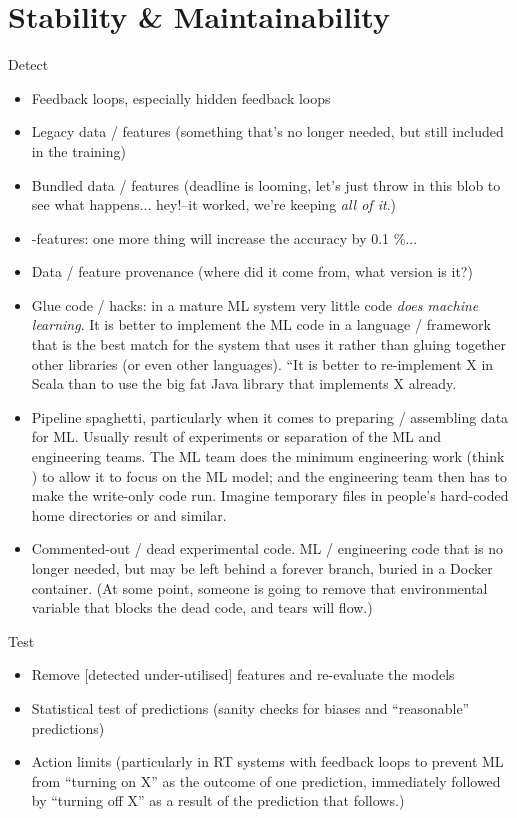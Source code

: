 \section{Stability \& Maintainability}
Detect
\begin{itemize}
  \item Feedback loops, especially hidden feedback loops
  \item Legacy data / features (something that's no longer needed, but still included in the training)
  \item Bundled data / features (deadline is looming, let's just throw in this blob to see what happens... hey!--it worked, we're keeping \emph{all of it}.)
  \item \textepsilon-features: one more thing will increase the accuracy by 0.1 \%...
  \item Data / feature provenance (where did it come from, what version is it?)
  \item Glue code / hacks: in a mature ML system very little code \emph{does machine learning}. It is better to implement the ML code in a language / framework that is the best match for the system that uses it rather than gluing together other libraries (or even other languages). ``It is better to re-implement X in Scala than to use the big fat Java library that implements X already.
  \item Pipeline spaghetti, particularly when it comes to preparing / assembling data for ML. Usually result of experiments or separation of the ML and engineering teams. The ML team does the minimum engineering work (think ) to allow it to focus on the ML model; and the engineering team then has to make the write-only code run. Imagine temporary files in people's hard-coded home directories or  and similar.
  \item Commented-out / dead experimental code. ML / engineering code that is no longer needed, but may be left behind a forever  branch, buried in a Docker container. (At some point, someone is going to remove that environmental variable that blocks the dead code, and tears will flow.)
\end{itemize}

Test
\begin{itemize}
  \item Remove [detected under-utilised] features and re-evaluate the models
  \item Statistical test of predictions (sanity checks for biases and ``reasonable'' predictions)
  \item Action limits (particularly in RT systems with feedback loops to prevent ML from ``turning on X'' as the outcome of one prediction, immediately followed by ``turning off X'' as a result of the prediction that follows.)
\end{itemize}  

\printbibliography


